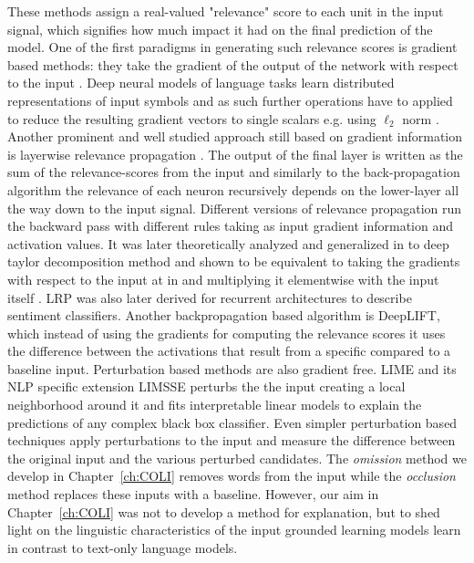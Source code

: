 These methods assign a real-valued "relevance" score to each unit in the input signal, which signifies how much impact it had on the final prediction of the model.
One of the first paradigms in generating such relevance scores is gradient based methods: they take the gradient of the output of the network with respect to the input \cite{simonyan2013deep}.
Deep neural models of language tasks learn distributed representations of input symbols and as such further operations have to applied to reduce the resulting gradient vectors to
single scalars e.g. using $\ell_2$ norm \cite{bansal2016ask}. Another prominent and well studied approach still based on gradient information is layerwise
relevance propagation \cite{bach2015pixel}. The output of the final layer
is written as the sum of the relevance-scores from the input and similarly to the back-propagation algorithm the relevance of each neuron
recursively depends on the lower-layer all the way down to the input signal. Different versions of relevance propagation
run the backward pass with different rules taking as input gradient information and activation values. It
was later theoretically analyzed and generalized in to deep taylor decomposition method \cite{binder2016layer} and shown to be equivalent to taking the gradients with respect
to the input at in \citep{simonyan2013deep} and multiplying it elementwise with the input itself \cite{shrikumar2017learning}.
LRP was also later derived for recurrent architectures \cite{arras2017explaining} to describe sentiment classifiers.
Another backpropagation based algorithm is DeepLIFT, which instead of using the gradients for computing the relevance scores it uses the difference between the activations
that result from a specific compared  to a baseline input. Perturbation based methods are also gradient free. LIME \cite{ribeiro2016should} and its NLP specific extension
LIMSSE \cite{poerner2018evaluating} perturbs the
the input creating a local neighborhood around it and fits interpretable linear models to explain the predictions of any complex black box classifier.
Even simpler perturbation based techniques apply perturbations to the input and measure the difference between the original input and the various
perturbed candidates. The \emph{omission} method we develop in Chapter~\ref{ch:COLI} removes words from the input while the \emph{occlusion} \cite{li2016understanding}
method replaces these inputs with a baseline.  However, our aim in Chapter~\ref{ch:COLI} was not to develop a method for explanation, but to
shed light on the linguistic characteristics of the input grounded learning models learn in contrast to text-only language models.
